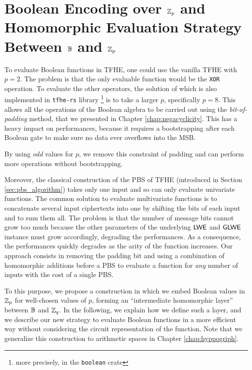 \section{Boolean Encoding over $\mathbb{Z}_p$ and Homomorphic Evaluation Strategy Between $\mathbb{B}$ and $\mathbb{Z}_p$}
\label{sec:p_encodings_homorphic_layer}

To evaluate Boolean functions in TFHE, one could use the vanilla TFHE with $p=2$. The problem is that the only evaluable function would be the \texttt{XOR} operation. To evaluate the other operators, the solution of \cite{JC:CGGI20} which is also implemented in \texttt{tfhe-rs} library \cite{tfhe-rs} \footnote{more precisely, in the \texttt{boolean} crate} is to take a larger $p$, specifically $p=8$. This allows all the operations of the Boolean algebra to be carried out using the \textit{bit-of-padding} method, that we presented in Chapter \ref{chap:negacyclicity}. This has a heavy impact on performances, because it requires a bootstrapping after each Boolean gate to make sure no data ever overflows into the MSB.

By using \emph{odd} values for $p$, we remove this constraint of padding and can perform more operations without bootstrapping.


Moreover, the classical construction of the PBS of TFHE (introduced in Section \ref{sec:pbs_algorithm}) takes only one input and so can only evaluate univariate functions. The common solution to evaluate multivariate functions is to concatenate several input ciphertexts into one by shifting the bits of each input and to sum them all. The problem is that the number of message bits cannot grow too much because the other parameters of the underlying $\textsf{LWE}$ and $\textsf{GLWE}$ instance must grow accordingly, degrading the performances. As a consequence, the performances quickly degrades as the arity of the function increases. Our approach consists in removing the padding bit and using a combination of homomorphic additions before a PBS to evaluate a function for \emph{any} number of inputs with the cost of a single PBS.


To this purpose, we propose a construction in which we embed Boolean values in $\mathbb{Z}_p$ for well-chosen values of $p$, forming an ``intermediate homomorphic layer'' between $\mathbb{B}$ and $\mathbb{Z}_q$. In the following, we explain how we define such a layer, and we describe our new strategy to evaluate Boolean functions in a more efficient way without considering the circuit representation of the function. Note that we generalize this construction to arithmetic spaces in Chapter \ref{chap:hyppogriph}.


